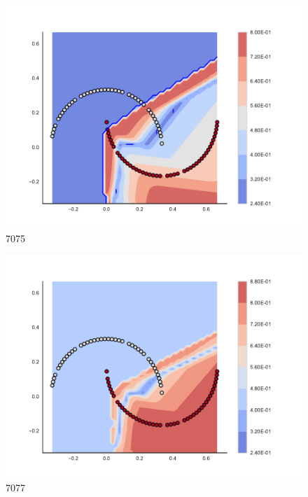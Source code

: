 \begin{subfigure}[b]{0.09\textwidth}
    \includegraphics[clip, trim=2.35cm 1.75cm 4.5cm 0cm,width=\textwidth]{img/convergence/7075.pdf}
    \caption{7075}
    \label{fig:convergence_7075}
\end{subfigure}
%
\begin{subfigure}[b]{0.09\textwidth}
    \includegraphics[clip, trim=2.35cm 1.75cm 4.5cm 0cm,width=\textwidth]{img/convergence/7077.pdf}
    \caption{7077}
    \label{fig:convergence_7077}
\end{subfigure}
%
